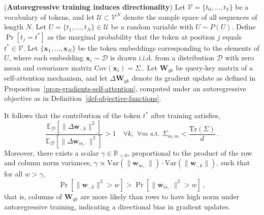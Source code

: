 \begin{theorem}
\label{theo-gradient-directionality}
%
(\textbf{Autoregressive training induces directionality})
Let \( \mathcal{V} = \{t_0, \dots, t_V\} \) be a vocabulary of tokens, and let \( \mathcal{U} \subset \mathcal{V}^N \) denote the sample space of all sequences of length \( N \). Let \( U = \{t_1, \dots, t_N\} \in \mathcal{U} \) be a random variable with \( U \sim P(U) \). Define \( \Pr[t_j = t^*] \) as the marginal probability that the token at position \( j \) equals \( t^* \in \mathcal{V} \).
%
Let \( \{\bm{x}_1, \dots, \bm{x}_N\} \) be the token embeddings corresponding to the elements of \( U \), where each embedding \( \bm{x}_i \sim \mathcal{D} \) is drawn i.i.d. from a distribution \( \mathcal{D} \) with zero mean and covariance matrix $\text{Cov}(\bm{x}_i)  = \Sigma$..
%
Let \( \bm{W}_{qk} \) be query-key matrix of a self-attention mechanism, and let \( \Delta \bm{W}_{qk} \) denote its gradient update as defined in Proposition~\ref{prop-gradients-self-attention}, computed under an autoregressive objective as in Definition~\ref{def-objective-functions}.
%

It follows that the contribution of the token \( t^* \) after training satisfies, 
%
\begin{equation}
\frac{\mathbb{E}_{\mathcal{D}}\left[ \|\Delta \bm{w}_{\cdot, k}\|^2 \right]}{\mathbb{E}_{\mathcal{D}}\left[ \|\Delta \bm{w}_{m, \cdot}\|^2 \right]} > 1 
\quad \forall k, \,\,\forall m\,\, \text{s.t.} \,\, \Sigma_{m,m} < \frac{\mathrm{Tr}(\Sigma)}{d} \,.
\end{equation}
%
Moreover, there exists a scalar \( \gamma \in \mathbb{R}_{>0} \), proportional to the product of the row and column norm variances, $
\gamma \propto \mathrm{Var}\left(\|\bm{w}_{m,\cdot}\|\right) \cdot \mathrm{Var}\left(\|\bm{w}_{\cdot,k}\|\right)$,
such that for all \( w > \gamma \),
\begin{equation}
    \Pr\left[\|\bm{w}_{\cdot, k}\|^2 > w\right] > \Pr\left[\|\bm{w}_{m, \cdot}\|^2 > w\right] \,,
\end{equation}
that is, columns of \( \bm{W}_{qk} \) are more likely than rows to have high norm under autoregressive training, indicating a directional bias in gradient updates.
%
\end{theorem}